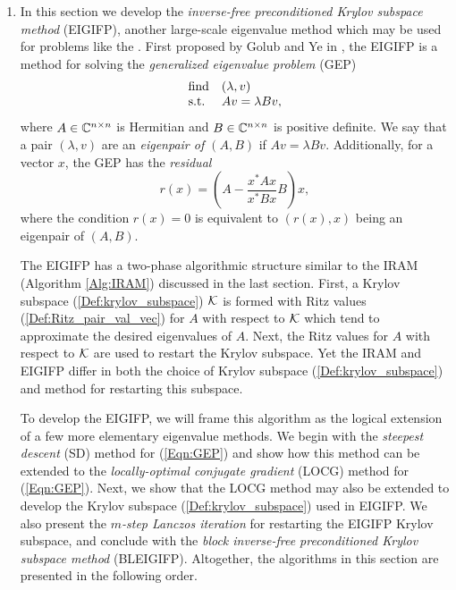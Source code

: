 \begin{enumerate}


\item



In this section we develop the \textit{inverse-free preconditioned Krylov subspace method} (EIGIFP), another large-scale eigenvalue method which may be used for problems like the \emep.  First proposed by Golub and Ye in \cite{golub2002inverse}, the EIGIFP is a method for solving the \textit{generalized eigenvalue problem} (GEP)
\begin{equation} 			\label{Eqn:GEP}
\begin{array}{ll}
\text{find}	
	&	(\lambda, v) \\
\textnormal{s.t.}
	&	Av = \lambda B v,
\end{array}
\end{equation}
where $A \in {\mathbb C}^{n \times n}$ is Hermitian and $B \in {\mathbb C}^{n \times n}$ is positive definite.  We say that a pair $(\lambda, v)$ are an \textit{eigenpair of $(A,B)$} if $Av = \lambda Bv$.  Additionally, for a vector $x$, the GEP has the \textit{residual}
\begin{equation} 			\label{Eqn:GEP_residual}
r(x) = \left( A - \frac{x^*Ax}{x^*Bx}  B \right)x,
\end{equation}
where the condition $r(x) = 0$ is equivalent to $(r(x), x)$ being an eigenpair of $(A,B)$.


The EIGIFP has a two-phase algorithmic structure similar to the IRAM (Algorithm \ref{Alg:IRAM}) discussed in the last section.  First, a Krylov subspace (\ref{Def:krylov_subspace}) ${\mathcal K}$ is formed with Ritz values (\ref{Def:Ritz_pair_val_vec}) for $A$ with respect to ${\mathcal K}$ which tend to approximate the desired eigenvalues of $A$.  Next, the Ritz values for $A$ with respect to ${\mathcal K}$ are used to restart the Krylov subspace.  Yet the IRAM and EIGIFP differ in both the choice of Krylov subspace (\ref{Def:krylov_subspace}) and method for restarting this subspace.  

To develop the EIGIFP, we will frame this algorithm as the logical extension of a few more elementary eigenvalue methods.  We begin with the \textit{steepest descent} (SD) method for (\ref{Eqn:GEP}) and show how this method can be extended to the \textit{locally-optimal conjugate gradient} (LOCG) method for (\ref{Eqn:GEP}).  Next, we show that the LOCG method may also be extended to develop the Krylov subspace (\ref{Def:krylov_subspace}) used in EIGIFP.  We also present the \textit{$m$-step Lanczos iteration} for restarting the EIGIFP Krylov subspace, and conclude with the \textit{block inverse-free preconditioned Krylov subspace method} (BLEIGIFP).  Altogether, the algorithms in this section are presented in the following order.


\end{enumerate}
